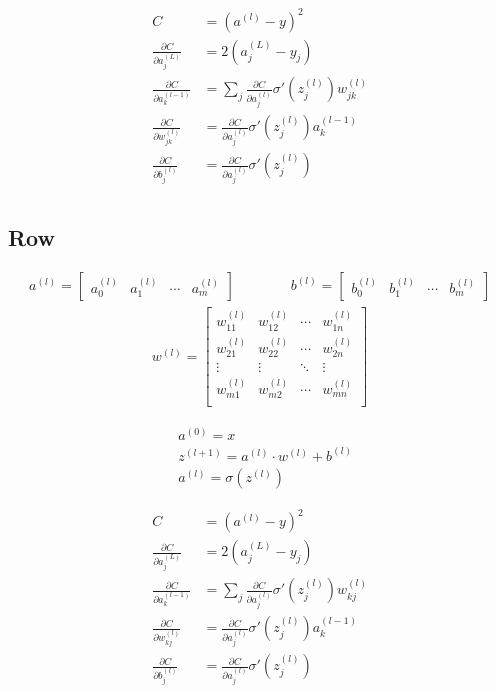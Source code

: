 \documentclass{article}
\begin{document}
\begin{align*}
C &= (a^{(l)} - y)^2\\
\frac{\partial C}{\partial a^{(L)}_j} &= 2 (a^{(L)}_j - y_j)\\
\frac{\partial C}{\partial a^{(l - 1)}_k} &= \sum _j \frac{\partial C}{\partial a^{(l)}_j} \sigma'(z^{(l)}_j) w^{(l)}_{jk}\\
\frac{\partial C}{\partial w^{(l)}_{jk}} &= \frac{\partial C}{\partial a^{(l)}_j} \sigma'(z^{(l)}_j) a^{(l - 1)}_k\\
\frac{\partial C}{\partial b^{(l)}_j} &= \frac{\partial C}{\partial a^{(l)}_j} \sigma'(z^{(l)}_j)\\
\end{align*}

\subsection{Row}

\begin{align*}
a^{(l)} =
\begin{bmatrix}
a^{(l)}_0 & a^{(l)}_1 & \cdots & a^{(l)}_m
\end{bmatrix}
%
\qquad \qquad
%
b^{(l)} = 
\begin{bmatrix}
b^{(l)}_0 & b^{(l)}_1 & \cdots & b^{(l)}_m
\end{bmatrix}
\end{align*}
\begin{align*}
w^{(l)} = 
\begin{bmatrix}
w^{(l)}_{11} & w^{(l)}_{12} & \cdots & w^{(l)}_{1n}\\
w^{(l)}_{21} & w^{(l)}_{22} & \cdots & w^{(l)}_{2n}\\
\vdots & \vdots & \ddots & \vdots\\
w^{(l)}_{m1} & w^{(l)}_{m2} & \cdots & w^{(l)}_{mn}\\
\end{bmatrix}
\end{align*}

\begin{align*}
&a^{(0)} = x\\
&z^{(l + 1)} = a^{(l)} \cdot w^{(l)} + b^{(l)}\\
&a^{(l)} = \sigma(z^{(l)})
\end{align*}

\begin{align*}
C &= (a^{(l)} - y)^2\\
\frac{\partial C}{\partial a^{(L)}_j} &= 2 (a^{(L)}_j - y_j)\\
\frac{\partial C}{\partial a^{(l - 1)}_k} &= \sum _j \frac{\partial C}{\partial a^{(l)}_j} \sigma'(z^{(l)}_j) w^{(l)}_{kj}\\
\frac{\partial C}{\partial w^{(l)}_{kj}} &= \frac{\partial C}{\partial a^{(l)}_j} \sigma'(z^{(l)}_j) a^{(l - 1)}_k\\
\frac{\partial C}{\partial b^{(l)}_j} &= \frac{\partial C}{\partial a^{(l)}_j} \sigma'(z^{(l)}_j)\\
\end{align*}
\end{document}
